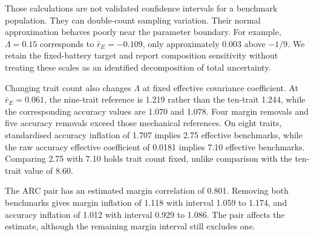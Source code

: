 Those calculations are not validated confidence intervals for a benchmark population. They can double-count sampling variation. Their normal approximation behaves poorly near the parameter boundary. For example, $\Lambda=0.15$ corresponds to $\bar r_E=-0.109$, only approximately 0.003 above $-1/9$. We retain the fixed-battery target and report composition sensitivity without treating these scales as an identified decomposition of total uncertainty.

Changing trait count also changes $\Lambda$ at fixed effective covariance coefficient. At $\bar r_E=0.061$, the nine-trait reference is 1.219 rather than the ten-trait 1.244, while the corresponding accuracy values are 1.070 and 1.078. Four margin removals and five accuracy removals exceed those mechanical references. On eight traits, standardised accuracy inflation of 1.707 implies 2.75 effective benchmarks, while the raw accuracy effective coefficient of 0.0181 implies 7.10 effective benchmarks. Comparing 2.75 with 7.10 holds trait count fixed, unlike comparison with the ten-trait value of 8.60.

The ARC pair has an estimated margin correlation of 0.801. Removing both benchmarks gives margin inflation of 1.118 with interval 1.059 to 1.174, and accuracy inflation of 1.012 with interval 0.929 to 1.086. The pair affects the estimate, although the remaining margin interval still excludes one.

